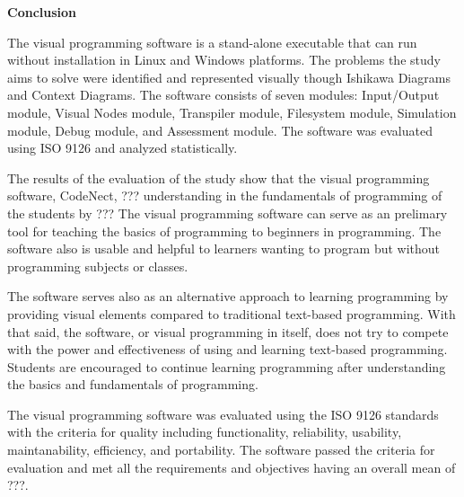 \flushleft
\textbf{Conclusion}
\justifying

\parx
The visual programming software is a stand-alone executable that can run
without installation in Linux and Windows platforms. The problems the study
aims to solve were identified and represented visually though Ishikawa Diagrams
and Context Diagrams. The software consists of seven modules: Input/Output
module, Visual Nodes module, Transpiler module, Filesystem module, Simulation
module, Debug module, and Assessment module. The software was evaluated using
ISO 9126 and analyzed statistically.

\parx
The results of the evaluation of the study show that the visual programming software,
CodeNect, ??? understanding in the fundamentals of programming of the
students by ??? The visual programming software can serve as an prelimary tool
for teaching the basics of programming to beginners in programming. The software also
is usable and helpful to learners wanting to program but without programming subjects
or classes.

\parx
The software serves also as an alternative approach to learning programming by
providing visual elements compared to traditional text-based programming. With
that said, the software, or visual programming in itself, does not try to
compete with the power and effectiveness of using and learning text-based
programming. Students are encouraged to continue learning programming after
understanding the basics and fundamentals of programming.

\parx
The visual programming software was evaluated using the ISO 9126 standards with the
criteria for quality including functionality, reliability, usability, maintanability,
efficiency, and portability. The software passed the criteria for evaluation and met
all the requirements and objectives having an overall mean of ???.
